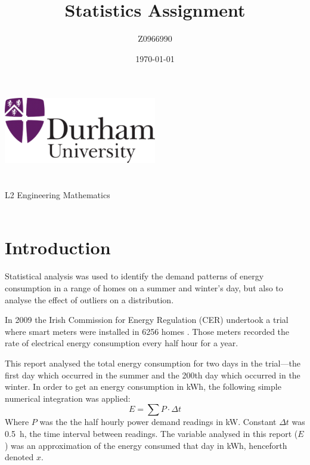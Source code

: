 \documentclass[a4paper,10pt,twocolumn]{article}
\author{Z0966990}
\title{Statistics Assignment}
\date{\today}
\begin{document}
    
\begin{titlepage}
    \centering
    \vspace*{\fill}
    \includegraphics[width=0.5\textwidth]{Durham}\\
    \vspace*{\fill}
    \LARGE\thetitle\\
    \large\theauthor\\
    \large L2 Engineering Mathematics\\
    \large\thedate\\
    \vspace*{\fill}
\end{titlepage}


\printnomenclature

\section{Introduction}

Statistical analysis was used to identify the demand patterns of energy 
consumption in a range of homes on a summer and winter's day, but also to 
analyse the effect of outliers on a distribution.

In 2009 the Irish Commission for Energy Regulation (CER) undertook a trial 
where smart meters were installed in 6256 homes \cite{martinsmart}. Those 
meters recorded the rate of electrical energy consumption every half hour for a 
year.

This report analysed the total energy consumption for two days in the 
trial---the first day which occurred in the summer and the 200th day which 
occurred in the winter. In order to get an energy consumption in kWh, the  
following simple numerical integration was applied:
\begin{equation}
    E = \sum{P \cdot \Delta t}
    \label{eq:Integrate}
\end{equation}
Where $P$ was the the half hourly power demand readings in kW. Constant $\Delta 
t$ was 0.5~h, the time interval between readings. The variable analysed in this 
report ($E$) was an approximation of the energy consumed that day in kWh, 
henceforth denoted $x$.
\end{document}
